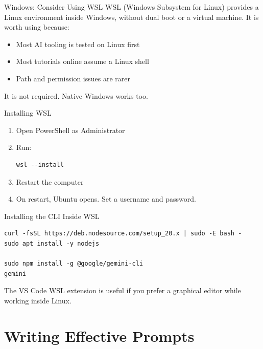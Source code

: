 \documentclass[aspectratio=169,11pt]{beamer}
\begin{document}
\begin{frame}{Windows: Consider Using WSL}
  WSL (Windows Subsystem for Linux) provides a Linux environment inside Windows, without dual boot or a virtual machine.
  \vfill
  It is worth using because:
  \begin{itemize}
    \setlength\itemsep{0.4em}
    \item Most AI tooling is tested on Linux first
    \item Most tutorials online assume a Linux shell
    \item Path and permission issues are rarer
  \end{itemize}
  \vfill
  It is not required. Native Windows works too.
\end{frame}

\begin{frame}[fragile]{Installing WSL}
  \begin{enumerate}
    \setlength\itemsep{0.4em}
    \item Open PowerShell as Administrator
    \item Run:
      \begin{lstlisting}
wsl --install
      \end{lstlisting}
    \item Restart the computer
    \item On restart, Ubuntu opens. Set a username and password.
  \end{enumerate}
\end{frame}

\begin{frame}[fragile]{Installing the CLI Inside WSL}
  \begin{lstlisting}
curl -fsSL https://deb.nodesource.com/setup_20.x | sudo -E bash -
sudo apt install -y nodejs

sudo npm install -g @google/gemini-cli
gemini
  \end{lstlisting}
  \vfill
  The VS Code WSL extension is useful if you prefer a graphical editor while working inside Linux.
\end{frame}

\section{Writing Effective Prompts}
\end{document}
